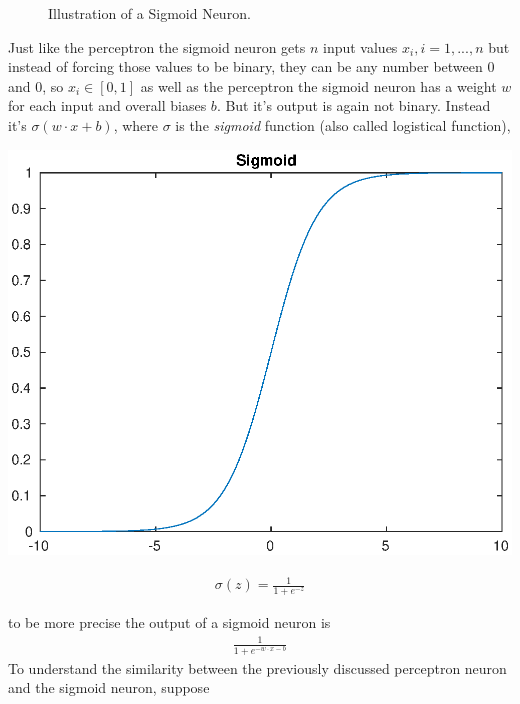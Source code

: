 \documentclass[10pt]{book}
\begin{document}
    \begin{figure}[h]
        \begin{center}
        \end{center}
        \caption{Illustration of a Sigmoid Neuron.\label{fig:Sigmoid}}
    \end{figure}
    Just like the perceptron the sigmoid neuron gets \(n\) input values \(x_i, i=1, ...,n\) but instead of forcing those values to be binary,
    they can be any number between \(0\) and \(0\), so \(x_i \in [0, 1]\) as well as the perceptron the sigmoid neuron has a weight \(w\) for each input and overall biases \(b\). But it's output is
    again not binary. Instead it's \(\sigma(w \cdot x + b)\), where \(\sigma\) is the \textit{sigmoid} function (also called logistical function),
    \begin{multicols}{2}
        \includegraphics[width=.45\textwidth]{sigmoid.eps}
        
        \columnbreak
        \vspace*{.6cm}

        \begin{align}
            \sigma(z) = \frac{1}{1+e^{-z}}
        \end{align}

    \end{multicols}
    to be more precise the output of a sigmoid neuron is
    \begin{align}
        \frac{1}{1+e^{-w \cdot x - b}}
    \end{align}
    To understand the similarity between the previously discussed perceptron neuron and the sigmoid neuron, suppose
\end{document}
